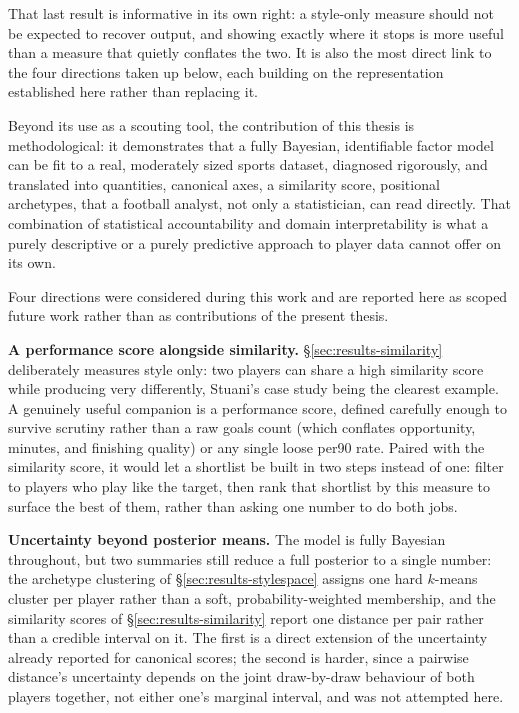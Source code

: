 That last result is informative in its own right: a style-only measure should not be expected to
recover output, and showing exactly where it stops is more useful than a measure that quietly
conflates the two. It is also the most direct link to the four directions taken up below, each
building on the representation established here rather than replacing it.

Beyond its use as a scouting tool, the contribution of this thesis is methodological: it
demonstrates that a fully Bayesian, identifiable factor model can be fit to a real, moderately
sized sports dataset, diagnosed rigorously, and translated into quantities, canonical axes, a
similarity score, positional archetypes, that a football analyst, not only a statistician, can
read directly. That combination of statistical accountability and domain interpretability is
what a purely descriptive or a purely predictive approach to player data cannot offer on its
own.

Four directions were considered during this work and are reported here as scoped future work rather than as
contributions of the present thesis.

\textbf{A performance score alongside similarity.} \S\ref{sec:results-similarity} deliberately measures style
only: two players can share a high similarity score while producing very differently, Stuani's case study
being the clearest example. A genuinely useful companion is a performance score, defined carefully enough to
survive scrutiny rather than a raw goals count (which conflates opportunity, minutes, and finishing quality)
or any single loose per90 rate. Paired with the similarity score, it would let a shortlist be built in two
steps instead of one: filter to players who play like the target, then rank that shortlist by this measure to
surface the best of them, rather than asking one number to do both jobs.

\textbf{Uncertainty beyond posterior means.} The model is fully Bayesian throughout, but two summaries still
reduce a full posterior to a single number: the archetype clustering of \S\ref{sec:results-stylespace} assigns
one hard $k$-means cluster per player rather than a soft, probability-weighted membership, and the similarity
scores of \S\ref{sec:results-similarity} report one distance per pair rather than a credible interval on it.
The first is a direct extension of the uncertainty already reported for canonical scores; the second is
harder, since a pairwise distance's uncertainty depends on the joint draw-by-draw behaviour of both players
together, not either one's marginal interval, and was not attempted here.

